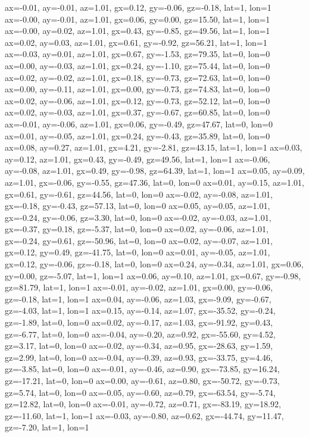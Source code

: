 ax=-0.01, ay=-0.01, az=1.01, gx=0.12, gy=-0.06, gz=-0.18, lat=1, lon=1
ax=-0.00, ay=-0.01, az=1.01, gx=0.06, gy=0.00, gz=15.50, lat=1, lon=1
ax=-0.00, ay=0.02, az=1.01, gx=0.43, gy=-0.85, gz=49.56, lat=1, lon=1
ax=0.02, ay=0.03, az=1.01, gx=0.61, gy=-0.92, gz=56.21, lat=1, lon=1
ax=-0.03, ay=0.01, az=1.01, gx=0.67, gy=-1.53, gz=79.35, lat=0, lon=0
ax=0.00, ay=-0.03, az=1.01, gx=0.24, gy=-1.10, gz=75.44, lat=0, lon=0
ax=0.02, ay=-0.02, az=1.01, gx=0.18, gy=-0.73, gz=72.63, lat=0, lon=0
ax=0.00, ay=-0.11, az=1.01, gx=0.00, gy=-0.73, gz=74.83, lat=0, lon=0
ax=0.02, ay=-0.06, az=1.01, gx=0.12, gy=-0.73, gz=52.12, lat=0, lon=0
ax=0.02, ay=-0.03, az=1.01, gx=0.37, gy=-0.67, gz=60.85, lat=0, lon=0
ax=-0.01, ay=-0.06, az=1.01, gx=0.06, gy=-0.49, gz=47.67, lat=0, lon=0
ax=0.01, ay=-0.05, az=1.01, gx=0.24, gy=-0.43, gz=35.89, lat=0, lon=0
ax=0.08, ay=0.27, az=1.01, gx=4.21, gy=-2.81, gz=43.15, lat=1, lon=1
ax=0.03, ay=0.12, az=1.01, gx=0.43, gy=-0.49, gz=49.56, lat=1, lon=1
ax=-0.06, ay=-0.08, az=1.01, gx=0.49, gy=-0.98, gz=64.39, lat=1, lon=1
ax=0.05, ay=0.09, az=1.01, gx=-0.06, gy=-0.55, gz=47.36, lat=0, lon=0
ax=0.01, ay=0.15, az=1.01, gx=0.61, gy=-0.61, gz=44.56, lat=0, lon=0
ax=-0.02, ay=-0.08, az=1.01, gx=-0.18, gy=-0.43, gz=57.13, lat=0, lon=0
ax=0.05, ay=0.05, az=1.01, gx=-0.24, gy=-0.06, gz=3.30, lat=0, lon=0
ax=-0.02, ay=-0.03, az=1.01, gx=-0.37, gy=0.18, gz=-5.37, lat=0, lon=0
ax=0.02, ay=-0.06, az=1.01, gx=-0.24, gy=0.61, gz=-50.96, lat=0, lon=0
ax=0.02, ay=-0.07, az=1.01, gx=0.12, gy=0.49, gz=-41.75, lat=0, lon=0
ax=0.01, ay=-0.05, az=1.01, gx=0.12, gy=-0.06, gz=-0.18, lat=0, lon=0
ax=0.24, ay=-0.34, az=1.01, gx=0.06, gy=0.00, gz=-5.07, lat=1, lon=1
ax=0.06, ay=0.10, az=1.01, gx=0.67, gy=-0.98, gz=81.79, lat=1, lon=1
ax=-0.01, ay=-0.02, az=1.01, gx=0.00, gy=-0.06, gz=-0.18, lat=1, lon=1
ax=0.04, ay=-0.06, az=1.03, gx=-9.09, gy=-0.67, gz=-4.03, lat=1, lon=1
ax=0.15, ay=-0.14, az=1.07, gx=-35.52, gy=-0.24, gz=-1.89, lat=0, lon=0
ax=0.02, ay=-0.17, az=1.03, gx=-91.92, gy=0.43, gz=-6.77, lat=0, lon=0
ax=-0.04, ay=-0.20, az=0.92, gx=-55.60, gy=4.52, gz=3.17, lat=0, lon=0
ax=-0.02, ay=-0.34, az=0.95, gx=-28.63, gy=1.59, gz=2.99, lat=0, lon=0
ax=-0.04, ay=-0.39, az=0.93, gx=-33.75, gy=4.46, gz=-3.85, lat=0, lon=0
ax=-0.01, ay=-0.46, az=0.90, gx=-73.85, gy=16.24, gz=-17.21, lat=0, lon=0
ax=0.00, ay=-0.61, az=0.80, gx=-50.72, gy=-0.73, gz=5.74, lat=0, lon=0
ax=-0.05, ay=-0.60, az=0.79, gx=-63.54, gy=-5.74, gz=12.82, lat=0, lon=0
ax=-0.01, ay=-0.72, az=0.71, gx=-83.19, gy=18.92, gz=-11.60, lat=1, lon=1
ax=-0.03, ay=-0.80, az=0.62, gx=-44.74, gy=11.47, gz=-7.20, lat=1, lon=1
